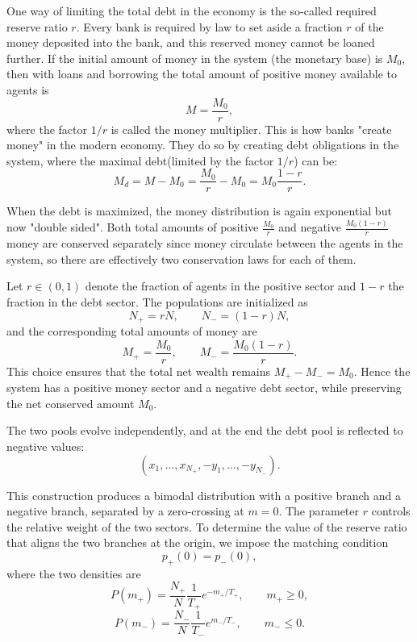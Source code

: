 

One way of limiting the total debt in the economy is the so-called
required reserve ratio $r$. Every bank is required by law
to set aside a fraction $r$ of the money deposited into the bank, and
this reserved money cannot be loaned further. 
If the initial amount of
money in the system (the monetary base) is $M_0$, then with loans and
borrowing the total amount of positive money available to agents is 
\begin{equation}
    M = \frac{M_0}{r},
\end{equation}
where the factor $1/r$ is called the money multiplier. 
This is how banks "create money" in the modern economy. 
They do so by creating debt obligations in the system, where the maximal debt(limited by the factor $1/r$) can be:
\begin{equation}
    M_d = M - M_0 = \frac{M_0}{r} - M_0  = M_0 \frac{1-r}{r}.
\end{equation}  




When the debt is maximized, the money distribution is again exponential but now "double sided".
Both total amounts of positive $\frac{M_0}{r}$ and negative $\frac{M_0(1-r)}{r}$ money are conserved separately
since money circulate between the agents in the
system, so there are eﬀectively two conservation laws for
each of them.

Let $r\in(0,1)$ denote the fraction of agents in the positive sector and $1-r$ the fraction in the debt sector. The populations are initialized as
\[
N_+ = rN, \qquad N_- = (1-r)N,
\]
and the corresponding total amounts of money are
\[
M_+ = \frac{M_0}{r}, \qquad M_- = \frac{M_0(1-r)}{r}.
\]
This choice ensures that the total net wealth remains
$M_+ - M_- =  M_0$.
Hence the system has a positive money sector and a negative debt sector, while preserving the net conserved amount $M_0$.


The two pools evolve independently, and at the end the debt pool is reflected to negative values:
\[
(x_1,\dots,x_{N_+},-y_1,\dots,-y_{N_-}).
\]

This construction produces a bimodal distribution with a positive branch and a negative branch, separated by a zero-crossing at $m=0$. The parameter $r$ controls the relative weight of the two sectors. To determine the value of the reserve ratio that aligns the two branches at the origin, we impose the matching condition
\[
p_+(0)=p_-(0),
\]
where the two densities are
\[
P(m_+) = \frac{N_+}{N}\frac{1}{T_+} e^{-m_+/T_+}, \qquad m_+\ge 0,
\]
\[
P(m_-) = \frac{N_-}{N}\frac{1}{T_-} e^{m_-/T_-}, \qquad m_-\le 0.
\]

